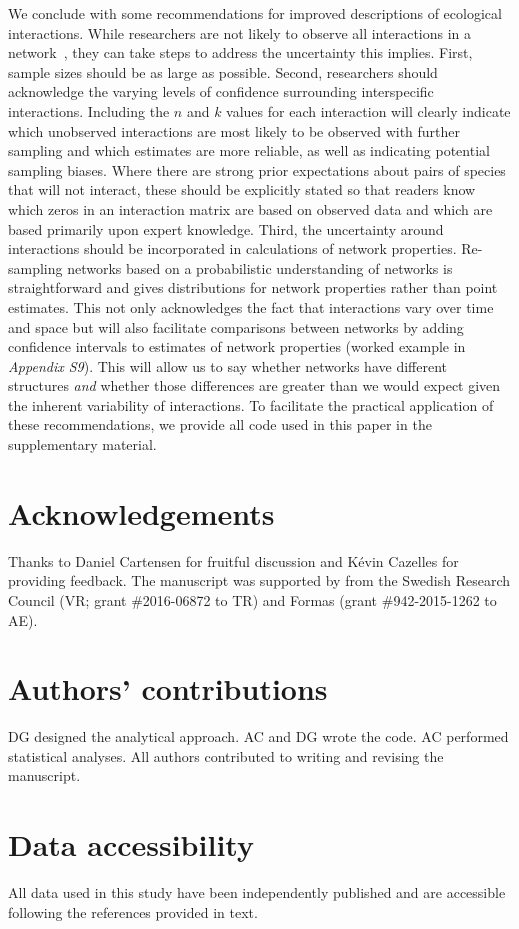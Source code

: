 \documentclass[12pt]{article}
\begin{document}
\begin{spacing}{2.0}
  We conclude with some recommendations for improved descriptions of ecological interactions. While researchers are not likely to observe all interactions in a network~\citep{Jordano2016}, they can take steps to address the uncertainty this implies. First, sample sizes should be as large as possible. Second, researchers should acknowledge the varying levels of confidence surrounding interspecific interactions. Including the $n$ and $k$ values for each interaction will clearly indicate which unobserved interactions are most likely to be observed with further sampling and which estimates are more reliable, as well as indicating potential sampling biases. Where there are strong prior expectations about pairs of species that will not interact, these should be explicitly stated so that readers know which zeros in an interaction matrix are based on observed data and which are based primarily upon expert knowledge. Third, the uncertainty around interactions should be incorporated in calculations of network properties. Re-sampling networks based on a probabilistic understanding of networks is straightforward and gives distributions for network properties rather than point estimates. This not only acknowledges the fact that interactions vary over time and space but will also facilitate comparisons between networks by adding confidence intervals to estimates of network properties (worked example in \emph{Appendix S9}). This will allow us to say whether networks have different structures \emph{and} whether those differences are greater than we would expect given the inherent variability of interactions. To facilitate the practical application of these recommendations, we provide all code used in this paper in the supplementary material. 


\section*{Acknowledgements}

  Thanks to Daniel Cartensen for fruitful discussion and K\'{e}vin Cazelles for providing feedback. The manuscript was supported by from the Swedish Research Council (VR; grant \#2016-06872 to TR) and Formas (grant \#942-2015-1262 to AE).


\section*{Authors' contributions}

DG designed the analytical approach. AC and DG wrote the code. AC performed statistical analyses. All authors contributed to writing and revising the manuscript.


\section*{Data accessibility}

All data used in this study have been independently published and are accessible following the references provided in text.



\end{spacing}
\clearpage
\end{document}
